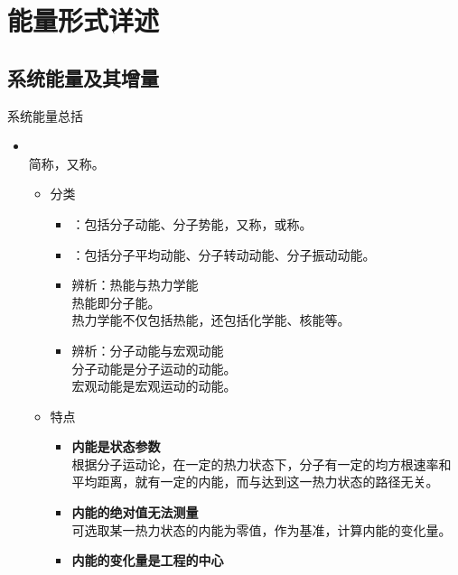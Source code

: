 \section{能量形式详述}
\subsection{系统能量及其增量}
系统能量总括
\begin{itemize}
	\item {}\\
	\hspace*{2em} 简称，又称。
	\vspace*{-0.5em}
	\begin{itemize}
		\item 分类
		\begin{itemize}
			\item {}：包括分子动能、分子势能，又称，或称。
			\item {}：包括分子平均动能、分子转动动能、分子振动动能。
			\item 辨析：热能与热力学能\\
			\hspace*{1.5em} 热能即分子能。\\
			\hspace*{1.5em} 热力学能不仅包括热能，还包括化学能、核能等。
			\item 辨析：分子动能与宏观动能\\
			\hspace*{1.5em} 分子动能是分子运动的动能。\\
			\hspace*{1.5em} 宏观动能是宏观运动的动能。
		\end{itemize}
	\item 特点
	\begin{itemize}
		\item \textbf{内能是状态参数}\\
		\hspace*{2em}根据分子运动论，在一定的热力状态下，分子有一定的均方根速率和平均距离，就有一定的内能，而与达到这一热力状态的路径无关。
		\item \textbf{内能的绝对值无法测量}\\
		\hspace*{2em}可选取某一热力状态的内能为零值，作为基准，计算内能的变化量。
		\item \textbf{内能的变化量是工程的中心}\\

\end{itemize}
\end{itemize}
\end{itemize}
